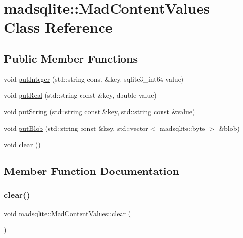 \hypertarget{classmadsqlite_1_1_mad_content_values}{}\section{madsqlite\+:\+:Mad\+Content\+Values Class Reference}
\label{classmadsqlite_1_1_mad_content_values}
\subsection*{Public Member Functions}
\begin{DoxyCompactItemize}
\item 
void \hyperlink{classmadsqlite_1_1_mad_content_values_a7441e7284d67e99d467fe37cb4120bec}{put\+Integer} (std\+::string const \&key, sqlite3\+\_\+int64 value)
\item 
void \hyperlink{classmadsqlite_1_1_mad_content_values_a00a8a96f001511a9201b6b6436ae27b7}{put\+Real} (std\+::string const \&key, double value)
\item 
void \hyperlink{classmadsqlite_1_1_mad_content_values_ab00bdb442e3f04ff4e3dc7e04d5b68dd}{put\+String} (std\+::string const \&key, std\+::string const \&value)
\item 
void \hyperlink{classmadsqlite_1_1_mad_content_values_a372ac7c6da044c9fa95fe01db3d3b166}{put\+Blob} (std\+::string const \&key, std\+::vector$<$ madsqlite\+::byte $>$ \&blob)
\item 
void \hyperlink{classmadsqlite_1_1_mad_content_values_a2415e71ac9c77ca280f9bb8feb433d54}{clear} ()
\end{DoxyCompactItemize}


\subsection{Member Function Documentation}
\hypertarget{classmadsqlite_1_1_mad_content_values_a2415e71ac9c77ca280f9bb8feb433d54}{}\label{classmadsqlite_1_1_mad_content_values_a2415e71ac9c77ca280f9bb8feb433d54} 
\subsubsection{\texorpdfstring{clear()}{clear()}}
{\footnotesize\ttfamily void madsqlite\+::\+Mad\+Content\+Values\+::clear (\begin{DoxyParamCaption}{ }\end{DoxyParamCaption})}

